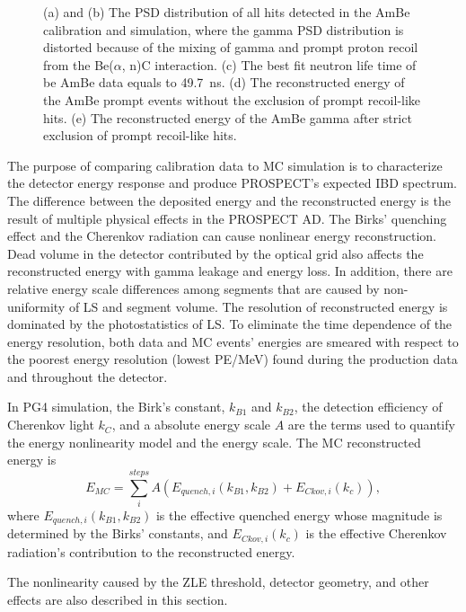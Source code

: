 \begin{figure}[h!]
\caption[AmBe gamma reconstruction]{(a) and (b) The PSD distribution of all hits detected in the AmBe calibration and simulation, where the gamma PSD distribution is distorted because of the mixing of gamma and prompt proton recoil from the Be($\alpha$, n)C interaction.
	(c) The best fit neutron life time of be AmBe data equals to 49.7~ns.
	(d) The reconstructed energy of the AmBe prompt events without the exclusion of prompt recoil-like hits.
	(e) The reconstructed energy of the AmBe gamma after strict exclusion of prompt recoil-like hits.}
\label{fig:AmBePlot}
\end{figure}


The purpose of comparing calibration data to MC simulation is to characterize the detector energy response and  produce PROSPECT's expected IBD spectrum.
The difference between the deposited energy and the reconstructed energy is the result of multiple physical effects in the PROSPECT AD.
The Birks' quenching effect and the Cherenkov radiation can cause nonlinear energy reconstruction.
Dead volume in the detector contributed by the optical grid also affects the reconstructed energy with gamma leakage and energy loss.
In addition, there are relative energy scale differences among segments that are caused by non-uniformity of LS and segment volume.
The resolution of reconstructed energy is dominated by  the photostatistics of LS.
To eliminate the time dependence of the energy resolution, both data and MC events' energies are smeared with respect to the poorest energy resolution (lowest PE/MeV) found during the production data and throughout the detector.

In PG4 simulation, the Birk’s constant, $k_{B1}$ and $k_{B2}$, the detection efficiency of Cherenkov light $k_{C}$, and a absolute energy scale $A$ are the terms used to quantify the energy nonlinearity model and the energy scale.
The MC reconstructed energy is  
\begin{equation}
E_{MC} = \sum_i^{steps} A(E_{quench,i}(k_{B1},k_{B2})+E_{Ckov,i}(k_c)),
\end{equation}
where $E_{quench,i}(k_{B1}, k_{B2})$ is the effective quenched energy whose magnitude is determined by the Birks' constants, and $E_{Ckov,i}(k_c)$ is the effective Cherenkov radiation's contribution to the reconstructed energy.

The nonlinearity caused by the ZLE threshold, detector geometry, and other effects are also described in this section.


